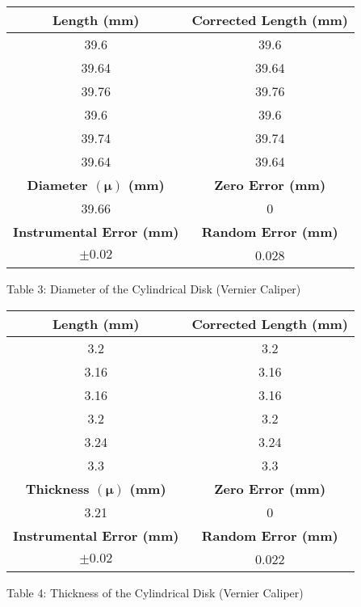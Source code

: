 \begin{center}
\begin{center}
\begin{tabular}{|c|c|}
        \hline
        \textbf{Length (mm)} & \textbf{Corrected Length (mm)} \\
        \hline
        39.6 & 39.6 \\
        \hline
        39.64 & 39.64 \\
        \hline
        39.76 & 39.76 \\
        \hline
        39.6 & 39.6  \\
        \hline
        39.74 & 39.74  \\
        \hline
        39.64 & 39.64  \\
        \hline
        \hline
        \textbf{Diameter $(\bm{\mu})$ (mm)} & \textbf{Zero Error (mm)}  \\
        \hline
        39.66 & 0 \\
        \hline
        \hline
        \textbf{Instrumental Error (mm)} & \textbf{Random Error (mm)}  \\
        \hline
        \(\pm0.02\) & 0.028 \\
        \hline
    \end{tabular}
\end{center}
Table 3: Diameter of the Cylindrical Disk (Vernier Caliper)
\begin{center}
    \begin{tabular}{|c|c|}
        \hline
        \textbf{Length (mm)} & \textbf{Corrected Length (mm)} \\
        \hline
        3.2 & 3.2 \\
        \hline
        3.16 & 3.16 \\
        \hline
        3.16 & 3.16 \\
        \hline
        3.2 & 3.2 \\
        \hline
        3.24 & 3.24 \\
        \hline
        3.3 & 3.3  \\
        \hline
        \hline
        \textbf{Thickness $(\bm{\mu})$ (mm)} & \textbf{Zero Error (mm)}  \\
        \hline
        3.21 & 0 \\
        \hline
        \hline
        \textbf{Instrumental Error (mm)} & \textbf{Random Error (mm)}  \\
        \hline
        \(\pm0.02\) & 0.022 \\
        \hline
    \end{tabular}
\end{center}
Table 4: Thickness of the Cylindrical Disk (Vernier Caliper)
\begin{center}

\end{center}
\end{center}
